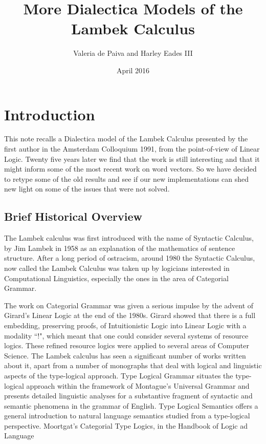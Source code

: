 \documentclass{article}
\title{More Dialectica Models of the Lambek Calculus}
\author{Valeria de Paiva and Harley Eades III}
\date{April 2016}
\begin{document}
\maketitle

\section*{Introduction}
This note recalls a Dialectica model of the Lambek Calculus presented
by the first author in the Amsterdam Colloquium 1991, from the
point-of-view of Linear Logic. Twenty five years later we find that
the work is still interesting and that it might inform some of the
most recent work on word vectors. So we have decided to retype some of
the old results and see if our new implementations can shed new light
on some of the issues that were not solved.

\subsection*{Brief Historical Overview}
The Lambek calculus was first introduced  with the name of Syntactic Calculus, by Jim Lambek in 1958  as an explanation of the mathematics of sentence structure.  After a long period of ostracism, around 1980 the Syntactic Calculus, now called the Lambek Calculus was taken up by logicians interested in Computational Linguistics, especially the ones in the area of Categorial Grammar. 

The work on Categorial Grammar was given a serious impulse by  the advent of Girard's Linear Logic at the end of the 1980s.  Girard showed that there is a full embedding, preserving proofs, of Intuitionistic Logic into Linear Logic with a modality ``!", which meant that one could consider several systems of resource logics. These refined resource logics were applied to several areas of Computer Science. The Lambek calculus has seen a significant number of works written about it, apart from a number of monographs that
deal with logical and linguistic aspects of the type-logical
approach.
Type Logical Grammar situates
the type-logical
approach
within
the framework of Montague's
Universal Grammar
and
presents detailed
linguistic
analyses
for a substantive fragment of syntactic
and semantic phenomena
in the grammar
of English.
Type Logical Semantics
 offers
a general
introduction
to natural language
semantics studied
from a type-logical
perspective. Moortgat's Categorial
Type Logics, in the Handbook of Logic ad Language
\end{document}
